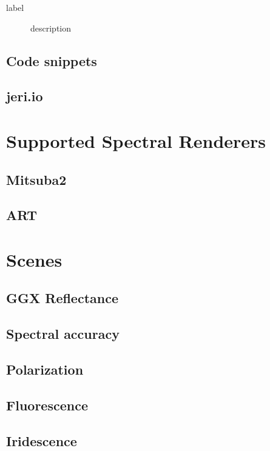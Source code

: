 \begin{description}
	\item[label] description
\end{description}

\subsection{Code snippets}

\subsection{jeri.io}

\section{Supported Spectral Renderers}

\subsection{Mitsuba2}

\subsection{ART}

\section{Scenes}

\subsection{GGX Reflectance}

\subsection{Spectral accuracy}

\subsection{Polarization}

\subsection{Fluorescence}

\subsection{Iridescence}



